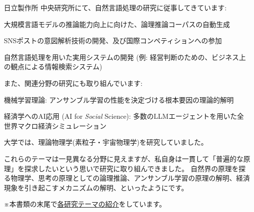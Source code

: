 \newenvironment{aboutitemize}{%
  \begin{list}{\labelitemi}{%
    \setlength{\leftmargin}{3zw}%
    \setlength{\labelsep}{0.6em}%
    \setlength{\itemsep}{0pt}%
    \setlength{\parsep}{0pt}%
    \setlength{\topsep}{0pt}%
    \setlength{\partopsep}{0pt}%
  }%
}{%
  \end{list}%
}

日立製作所 中央研究所にて、自然言語処理の研究に従事してきています:

\vspace{1mm}

\begin{aboutitemize}
  \item 大規模言語モデルの推論能力向上に向けた、論理推論コーパスの自動生成
  \item SNSポストの意図解析技術の開発、及び国際コンペティションへの参加
  \item 自然言語処理を用いた実用システムの開発 (例: 経営判断のための、ビジネス上の観点による情報検索システム)
\end{aboutitemize}

\vspace{3mm}

また、関連分野の研究にも取り組んでいます:
\vspace{1mm}
\begin{aboutitemize}
  \item 機械学習理論: アンサンブル学習の性能を決定づける根本要因の理論的解明
  \item 経済学へのAI応用 (AI for \textit{Social} Science): 多数のLLMエージェントを用いた全世界マクロ経済シミュレーション
\end{aboutitemize}
\vspace{0.5mm}


\vspace{3mm}
大学では、理論物理学(素粒子・宇宙物理学)を研究していました。


\vspace{3mm}
これらのテーマは一見異なる分野に見えますが、私自身は一貫して「普遍的な原理」を探求したいという思いで研究に取り組んできました。
自然界の原理を探る物理学、思考の原理としての論理推論、アンサンブル学習の原理の解明、経済現象を引き起こすメカニズムの解明、といったようにです。

\vspace{3mm}
{\raggedleft ※本書類の末尾で\hyperlink{cvresearchtopics}{\underline{各研究テーマの紹介}}をしています。\par}
